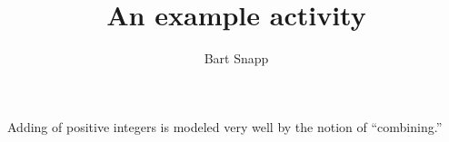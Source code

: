 \documentclass{ximera}
\author{Bart Snapp}
\title{An example activity}
\begin{document}
\begin{abstract}
\end{abstract}
\maketitle

Adding of positive integers is modeled very well by the notion of ``combining.''
\end{document}
